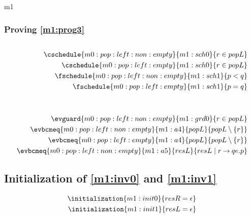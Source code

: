 \documentclass[12pt]{amsart}
\begin{document}
\begin{machine}{m1}
\subsubsection{Proving \ref{m1:prog3}}
\begin{align*}
\end{align*}
\begin{align*}
\cschedule{m0:pop:left:non:empty}{m1:sch0}{ r \in popL }
\\ \cschedule{m0:pop:left:empty}{m1:sch0}{ r \in popL }
\\ \fschedule{m0:pop:left:non:empty}{m1:sch1}{ p < q }
\\ \fschedule{m0:pop:left:empty}{m1:sch1}{ p = q }
\\ \removecoarse{m0:pop:left:non:empty}{default} %
\\ \removecoarse{m0:pop:left:empty}{default} %
\\ \evguard{m0:pop:left:non:empty}{m1:grd0}{ r \in popL }
\\ \evbcmeq{m0:pop:left:non:empty}{m1:a4}
	{popL}{ popL \setminus \{ r \} }
\\ \evbcmeq{m0:pop:left:empty}{m1:a4}
	{popL}{ popL \setminus \{ r \} }
\\ \evbcmeq{m0:pop:left:non:empty}{m1:a5}
	{resL}{ resL \1 | r \fun qe.p }
\end{align*}

\subsection{Initialization of \ref{m1:inv0} and \ref{m1:inv1}}

\begin{align*}
\initialization{m1:init0}{resR = \emptyfun}
\\ \initialization{m1:init1}{resL = \emptyfun}
\end{align*}




\end{machine}
 
\end{document}
